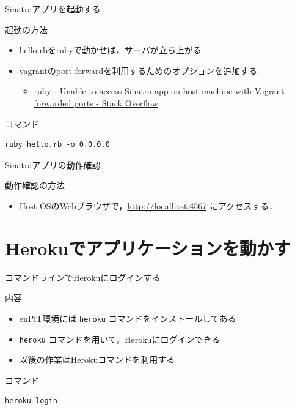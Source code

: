 \documentclass[t, aspectratio=169]{beamer}
\begin{document}
\begin{frame}[fragile,label=sec-5-1-4]{Sinatraアプリを起動する}
 \begin{block}{起動の方法}
\begin{itemize}
\item hello.rbをrubyで動かせば，サーバが立ち上がる
\item vagrantのport forwardを利用するためのオプションを追加する
\begin{itemize}
\item \href{http://stackoverflow.com/questions/21250885/unable-to-access-sinatra-app-on-host-machine-with-vagrant-forwarded-ports}{ruby - Unable to access Sinatra app on host machine with Vagrant forwarded ports - Stack Overflow}
\end{itemize}
\end{itemize}
\end{block}

\begin{block}{コマンド}
\begin{verbatim}
ruby hello.rb -o 0.0.0.0
\end{verbatim}
\end{block}
\end{frame}

\begin{frame}[label=sec-5-1-5]{Sinatraアプリの動作確認}
\begin{block}{動作確認の方法}
\begin{itemize}
\item Host OSのWebブラウザで，\url{http://localhost:4567} にアクセスする．
\end{itemize}
\end{block}
\end{frame}

\section{Herokuでアプリケーションを動かす}
\label{sec-5-2}
\begin{frame}[fragile,label=sec-5-2-1]{コマンドラインでHerokuにログインする}
 \begin{block}{内容}
\begin{itemize}
\item enPiT環境には \texttt{heroku} コマンドをインストールしてある
\item \texttt{heroku} コマンドを用いて，Herokuにログインできる
\item 以後の作業はHerokuコマンドを利用する
\end{itemize}
\end{block}
\begin{block}{コマンド}
\begin{verbatim}
heroku login
\end{verbatim}
\end{block}
\end{frame}
\end{document}
